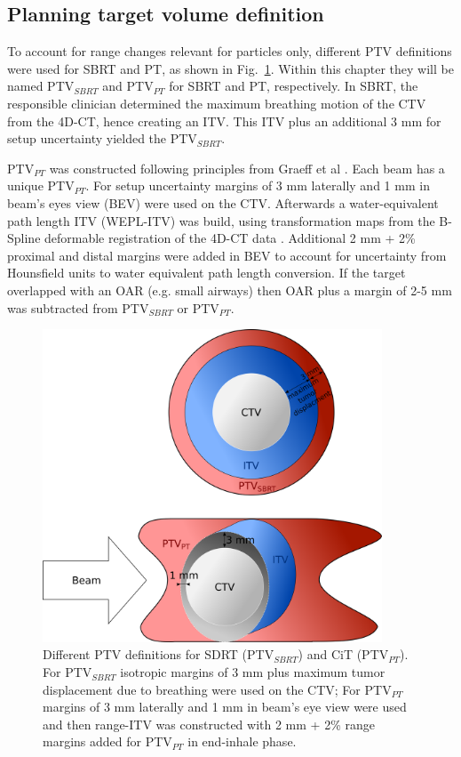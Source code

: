 \documentclass[type=dr, dr=rernat, acm$^3$entcolor=tud7b,colorbacktitle, bigchapter, openright, twoside, 12pt ]{tudthesis}
\begin{document}
\subsection{Planning target volume definition}

To account for range changes relevant for particles only, different PTV definitions were used for SBRT and PT, as shown in Fig.~\ref{Fig:PTV_def}. Within this chapter they will be named PTV$_{SBRT}$ and PTV$_{PT}$ for SBRT and PT, respectively.
In SBRT, the responsible clinician determined the maximum breathing motion of the CTV from the 4D-CT, hence creating an ITV. This ITV plus an additional 3 mm for setup uncertainty yielded the PTV$_{SBRT}$.

PTV$_{PT}$ was constructed following principles from Graeff et al \cite{Graeff2012}. Each beam has a unique PTV$_{PT}$. For setup uncertainty margins of 3 mm laterally and 1 mm in beam’s eyes view (BEV) were used on the CTV. Afterwards a water-equivalent path length ITV (WEPL-ITV) was build, using transformation maps from the B-Spline deformable registration of the 4D-CT data \cite{Shackleford2010}. Additional 2 mm + 2\% proximal and distal margins were added in BEV to account for uncertainty from Hounsfield units to water equivalent path length conversion.
If the target overlapped with an OAR (e.g. small airways) then OAR plus a margin of 2-5 mm was subtracted from PTV$_{SBRT}$ or PTV$_{PT}$.


\begin{figure}[H]
\begin{center}
\includegraphics[width=0.9\textwidth]{./Images/Figure1.png}
\caption{Different PTV definitions for SDRT (PTV$_{SBRT}$) and CiT (PTV$_{PT}$). For PTV$_{SBRT}$ isotropic margins of 3 mm plus maximum tumor displacement due to 
breathing were used on the CTV; For PTV$_{PT}$ margins of 3 mm laterally and 1 mm in beam’s eye view were used and then range-ITV was constructed with
2 mm + 2\% range margins added for PTV$_{PT}$ in end-inhale phase.}
\label{Fig:PTV_def}
\end{center}
\end{figure}
\end{document}
